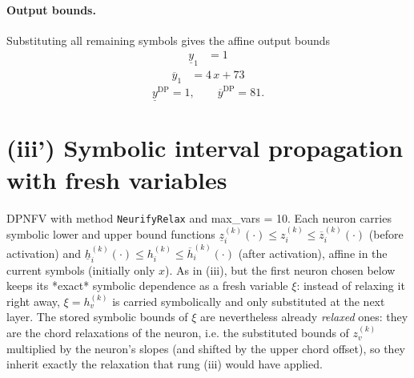 \documentclass[11pt]{article}
\begin{document}
\paragraph{Output bounds.}
Substituting all remaining symbols gives the affine output bounds
\begin{align*}
\underline{y}_{1} &= 1
\end{align*}
\begin{align*}
\overline{y}_{1} &= 4\,x + 73
\end{align*}
\begin{equation*}
\underline{y}^{\text{DP}} = 1, \qquad \overline{y}^{\text{DP}} = 81.
\end{equation*}

\section{(iii') Symbolic interval propagation with fresh variables}
DPNFV with method \texttt{NeurifyRelax} and max\_vars = 10. Each neuron carries symbolic lower and upper bound functions
$\underline{z}^{(k)}_i(\cdot) \le z^{(k)}_i \le \overline{z}^{(k)}_i(\cdot)$ (before activation)
and $\underline{h}^{(k)}_i(\cdot) \le h^{(k)}_i \le \overline{h}^{(k)}_i(\cdot)$ (after activation),
affine in the current symbols (initially only $x$).
As in (iii), but the first neuron chosen below keeps its *exact*
symbolic dependence as a fresh variable $\xi$: instead of relaxing it right away, $\xi = h^{(k)}_v$
is carried symbolically and only substituted at the next layer. The stored symbolic bounds of $\xi$
are nevertheless already \emph{relaxed} ones: they are the chord relaxations of the neuron, i.e.
the substituted bounds of $z^{(k)}_v$ multiplied by the neuron's slopes (and shifted by the upper
chord offset), so they inherit exactly the relaxation that rung (iii) would have applied.
\end{document}

